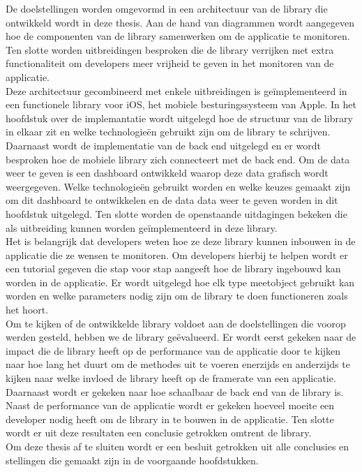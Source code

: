De doelstellingen worden omgevormd in een architectuur van de library die ontwikkeld wordt in deze thesis. Aan de hand van diagrammen wordt aangegeven hoe de componenten van de library samenwerken om de applicatie te monitoren. Ten slotte worden uitbreidingen besproken die de library verrijken met extra functionaliteit om developers meer vrijheid te geven in het monitoren van de applicatie. \\

Deze architectuur gecombineerd met enkele uitbreidingen is ge\"implementeerd in een functionele library voor iOS, het mobiele besturingssysteem van Apple. In het hoofdstuk over de implemantatie wordt uitgelegd hoe de structuur van de library in elkaar zit en welke technologie\"en gebruikt zijn om de library te schrijven. Daarnaast wordt de implementatie van de back end uitgelegd en er wordt besproken hoe de mobiele library zich connecteert met de back end. Om de data weer te geven is een dashboard ontwikkeld waarop deze data grafisch wordt weergegeven. Welke technologie\"en gebruikt worden en welke keuzes gemaakt zijn om dit dashboard te ontwikkelen en de data data weer te geven worden in dit hoofdstuk uitgelegd. Ten slotte worden de openstaande uitdagingen bekeken die als uitbreiding kunnen worden ge\"implementeerd in deze library.\\


Het is belangrijk dat developers weten hoe ze deze library kunnen inbouwen in de applicatie die ze wensen te monitoren. Om developers hierbij te helpen wordt er een tutorial gegeven die stap voor stap aangeeft hoe de library ingebouwd kan worden in de applicatie. Er wordt uitgelegd hoe elk type meetobject gebruikt kan worden en welke parameters nodig zijn om de library te doen functioneren zoals het hoort. \\

Om te kijken of de ontwikkelde library voldoet aan de doelstellingen die voorop werden gesteld, hebben we de library ge\"evalueerd. Er wordt eerst gekeken naar de impact die de library heeft op de performance van de applicatie door te kijken naar hoe lang het duurt om de methodes uit te voeren enerzijds en anderzijds te kijken naar welke invloed de library heeft op de framerate van een applicatie. Daarnaast wordt er gekeken naar hoe schaalbaar de back end van de library is. Naast de performance van de applicatie wordt er gekeken hoeveel moeite een developer nodig heeft om de library in te bouwen in de applicatie. Ten slotte wordt er uit deze resultaten een conclusie getrokken omtrent de library. \\

Om deze thesis af te sluiten wordt er een besluit getrokken uit alle conclusies en stellingen die gemaakt zijn in de voorgaande hoofdstukken. \\


